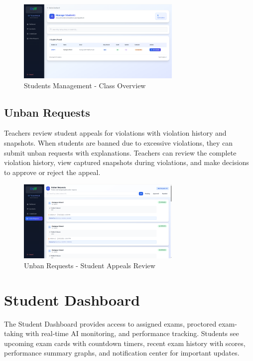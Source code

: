 \begin{figure}[p]
    \centering
    \includegraphics[width=0.7\textwidth]{Chap4/teacher_students.png}
    \caption{Students Management - Class Overview}
    \label{fig:teacher_students}
\end{figure}

\subsection{Unban Requests}

Teachers review student appeals for violations with violation history and snapshots. When students are banned due to excessive violations, they can submit unban requests with explanations. Teachers can review the complete violation history, view captured snapshots during violations, and make decisions to approve or reject the appeal.

\begin{figure}[p]
    \centering
    \includegraphics[width=0.7\textwidth]{Chap4/teacher_unban_requests.png}
    \caption{Unban Requests - Student Appeals Review}
    \label{fig:teacher_unban}
\end{figure}

\section{Student Dashboard}

The Student Dashboard provides access to assigned exams, proctored exam-taking with real-time AI monitoring, and performance tracking. Students see upcoming exam cards with countdown timers, recent exam history with scores, performance summary graphs, and notification center for important updates.

